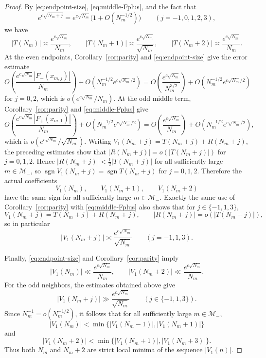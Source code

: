 \documentclass[reqno]{amsart}
\theoremstyle{definition}
\theoremstyle{plain}
\theoremstyle{remark}
\numberwithin{equation}{section}
\newcommand{\sgn}{\operatorname{sgn}}
\begin{document}
\begin{proof}
By \eqref{eq:endpoint-size}, \eqref{eq:middle-Fplus}, and the fact that
\[
  e^{c\sqrt{N_m+j}}=e^{c\sqrt{N_m}}\bigl(1+O(N_m^{-1/2})\bigr)
  \qquad (j=-1,0,1,2,3),
\]
we have
\begin{equation}\label{eq:main-sizes}
  |T(N_m)|\asymp \frac{e^{c\sqrt{N_m}}}{N_m},
  \qquad
  |T(N_m+1)|\asymp \frac{e^{c\sqrt{N_m}}}{\sqrt{N_m}},
  \qquad
  |T(N_m+2)|\asymp \frac{e^{c\sqrt{N_m}}}{N_m}.
\end{equation}
At the even endpoints, Corollary~\ref{cor:parity} and \eqref{eq:endpoint-size} give the error estimate
\[
  O\!\left(\frac{e^{c\sqrt{N_m}}|F_-(x_{m,j})|}{N_m}\right)
  +O\!\left(N_m^{-1/2}e^{c\sqrt{N_m}/2}\right)
  =O\!\left(\frac{e^{c\sqrt{N_m}}}{N_m^{3/2}}\right)
   +O\!\left(N_m^{-1/2}e^{c\sqrt{N_m}/2}\right)
\]
for $j=0,2$, which is $o(e^{c\sqrt{N_m}}/N_m)$. At the odd middle term, Corollary~\ref{cor:parity} and \eqref{eq:middle-Fplus} give
\[
  O\!\left(\frac{e^{c\sqrt{N_m}}|F_+(x_{m,1})|}{N_m}\right)
  +O\!\left(N_m^{-1/2}e^{c\sqrt{N_m}/2}\right)
  =O\!\left(\frac{e^{c\sqrt{N_m}}}{N_m}\right)
   +O\!\left(N_m^{-1/2}e^{c\sqrt{N_m}/2}\right),
\]
which is $o(e^{c\sqrt{N_m}}/\sqrt{N_m})$. Writing $V_1(N_m+j)=T(N_m+j)+R(N_m+j)$, the preceding estimates show that $|R(N_m+j)|=o(|T(N_m+j)|)$ for $j=0,1,2$. Hence $|R(N_m+j)|<\frac12|T(N_m+j)|$ for all sufficiently large $m\in\mathcal M_-$, so $\sgn V_1(N_m+j)=\sgn T(N_m+j)$ for $j=0,1,2$. Therefore the actual coefficients
\[
  V_1(N_m),\qquad V_1(N_m+1),\qquad V_1(N_m+2)
\]
have the same sign for all sufficiently large $m\in\mathcal M_-$. Exactly the same use of Corollary~\ref{cor:parity} with \eqref{eq:middle-Fplus} also shows that for $j\in\{-1,1,3\}$,
\[
  V_1(N_m+j)=T(N_m+j)+R(N_m+j),
  \qquad
  |R(N_m+j)|=o(|T(N_m+j)|),
\]
so in particular
\[
  |V_1(N_m+j)|\asymp \frac{e^{c\sqrt{N_m}}}{\sqrt{N_m}}
  \qquad (j=-1,1,3).
\]

Finally, \eqref{eq:endpoint-size} and Corollary~\ref{cor:parity} imply
\[
  |V_1(N_m)|\ll \frac{e^{c\sqrt{N_m}}}{N_m},
  \qquad
  |V_1(N_m+2)|\ll \frac{e^{c\sqrt{N_m}}}{N_m}.
\]
For the odd neighbors, the estimates obtained above give
\[
  |V_1(N_m+j)|\gg \frac{e^{c\sqrt{N_m}}}{\sqrt{N_m}}
  \qquad (j\in\{-1,1,3\}).
\]
Since $N_m^{-1}=o(N_m^{-1/2})$, it follows that for all sufficiently large $m\in\mathcal M_-$,
\[
  |V_1(N_m)|<\min\{|V_1(N_m-1)|,|V_1(N_m+1)|\}
\]
and
\[
  |V_1(N_m+2)|<\min\{|V_1(N_m+1)|,|V_1(N_m+3)|\}.
\]
Thus both $N_m$ and $N_m+2$ are strict local minima of the sequence $|V_1(n)|$.
\end{proof}
\end{document}

